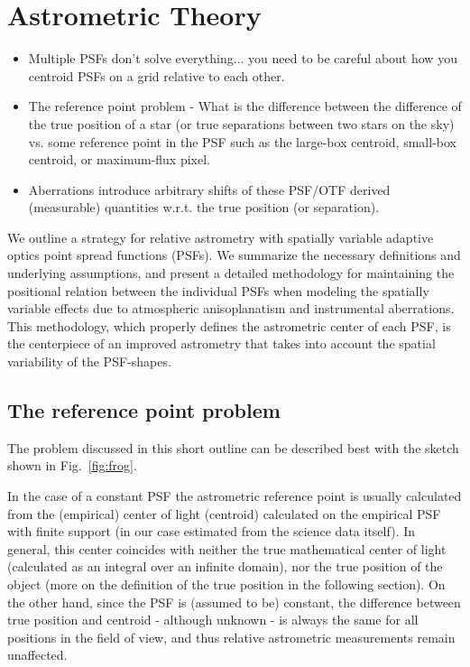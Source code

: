 \usepackage[english]{babel}
\usepackage[utf8]{inputenc}
\usepackage{amsmath}
\usepackage{graphicx}
\usepackage[colorinlistoftodos]{todonotes}

\section{Astrometric Theory}
\label{sec:astrometry_theory}

\begin{itemize}
\item Multiple PSFs don't solve everything... you need to be careful about how you centroid PSFs on a grid relative to each other. 
\item The reference point problem - What is the difference between the difference of the true position of a star (or true separations between two stars on the sky) vs. some reference point in the PSF such as the large-box centroid, small-box centroid, or maximum-flux pixel. 
\item Aberrations introduce arbitrary shifts of these PSF/OTF derived (measurable) quantities w.r.t. the true position (or separation).
\end{itemize}
  
We outline a strategy for relative astrometry with spatially variable adaptive optics point spread functions (PSFs). We summarize the necessary definitions and underlying assumptions, and present a detailed methodology for maintaining the positional relation between the individual PSFs when modeling the spatially variable effects due to atmospheric anisoplanatism and instrumental aberrations. This methodology, which properly defines the astrometric center of each PSF, is the centerpiece of an improved astrometry that takes into account the spatial variability of the PSF-shapes.

\subsection{The reference point problem}

The problem discussed in this short outline can be described best with the sketch shown in Fig.~\ref{fig:frog}. 

In the case of a constant PSF the astrometric reference point is usually calculated from the (empirical) center of light (centroid) calculated on the empirical PSF with finite support (in our case estimated from the science data itself). In general, this center coincides with neither the true mathematical center of light (calculated as an integral over an infinite domain), nor the true position of the object (more on the definition of the true position in the following section). On the other hand, since the PSF is (assumed to be) constant, the difference between true position and centroid - although unknown - is always the same for all positions in the field of view, and thus relative astrometric measurements remain unaffected.

